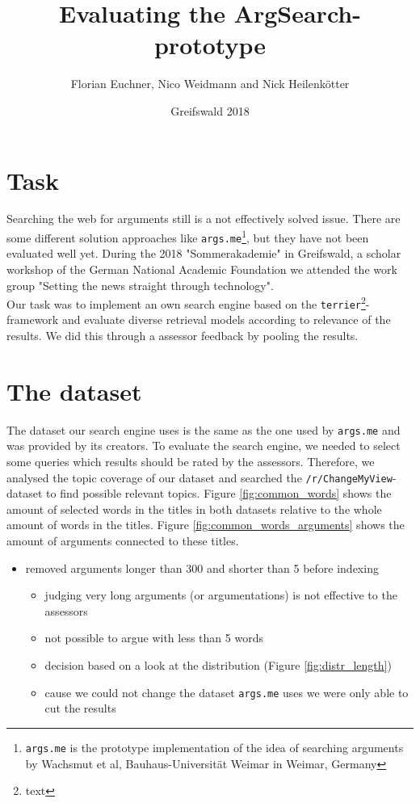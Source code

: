 \documentclass{scrartcl}
\begin{document}
	\title{Evaluating the ArgSearch-prototype}
	\author{Florian Euchner, Nico Weidmann and Nick Heilenkötter}
	\date{Greifswald 2018}
	\maketitle
	
	\section{Task}
	Searching the web for arguments still is a not effectively solved issue. There are some different solution approaches like \texttt{args.me}\footnote{\texttt{args.me} is the prototype implementation of the idea of searching arguments by Wachsmut et al, Bauhaus-Universität Weimar in Weimar, Germany}, but they have not been evaluated well yet. During the 2018 "Sommerakademie" in Greifswald, a scholar workshop of the German National Academic Foundation we attended the work group "Setting the news straight through technology".\\
	Our task was to implement an own search engine based on the \texttt{terrier}\footnote{text}-framework and evaluate diverse retrieval models according to relevance of the results. We did this through a assessor feedback by pooling the results.
	
	\section{The dataset}
	The dataset our search engine uses is the same as the one used by \texttt{args.me} and was provided by its creators.
	To evaluate the search engine, we needed to select some queries which results should be rated by the assessors. Therefore, we analysed the topic coverage of our dataset and  searched the \texttt{/r/ChangeMyView}-dataset to find possible relevant topics. Figure \ref{fig:common_words} shows the amount of selected  words in the titles in both datasets relative to the whole amount of words in the titles. Figure \ref{fig:common_words_arguments} shows the amount of arguments connected to these titles.
		\begin{itemize}
		\item removed arguments longer than 300 and shorter than 5 before indexing
		\begin{itemize}
			\item judging very long arguments (or argumentations) is not effective to the assessors
			\item not possible to argue with less than 5 words
			\item decision based on a look at the distribution (Figure \ref{fig:distr_length})
			\item cause we could not change the dataset \texttt{args.me} uses we were only able to cut the results
		\end{itemize}  
	\end{itemize}
	
\end{document}
